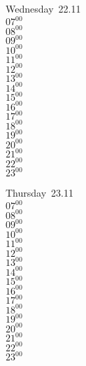 \documentclass[11pt, a4paper]{book}\usepackage[]{graphicx}\usepackage[]{color}
\begin{document}
\begin{weekdaybox}
  Wednesday~22.11\\
  { 
  \vfill
  $07^{00}$\\
$08^{00}$\\
$09^{00}$\\
$10^{00}$\\
$11^{00}$\\
$12^{00}$\\
$13^{00}$\\
$14^{00}$\\
$15^{00}$\\
$16^{00}$\\
$17^{00}$\\
$18^{00}$\\
$19^{00}$\\
$20^{00}$\\
$21^{00}$\\
$22^{00}$\\
$23^{00}$\\
  }
\end{weekdaybox}
\clearpage
\begin{headerbox}
\end{headerbox}
\begin{weekdaybox}
  Thursday~23.11\\
  { 
  \vfill
  $07^{00}$\\
$08^{00}$\\
$09^{00}$\\
$10^{00}$\\
$11^{00}$\\
$12^{00}$\\
$13^{00}$\\
$14^{00}$\\
$15^{00}$\\
$16^{00}$\\
$17^{00}$\\
$18^{00}$\\
$19^{00}$\\
$20^{00}$\\
$21^{00}$\\
$22^{00}$\\
$23^{00}$\\
  }
\end{weekdaybox} 
\end{document}
